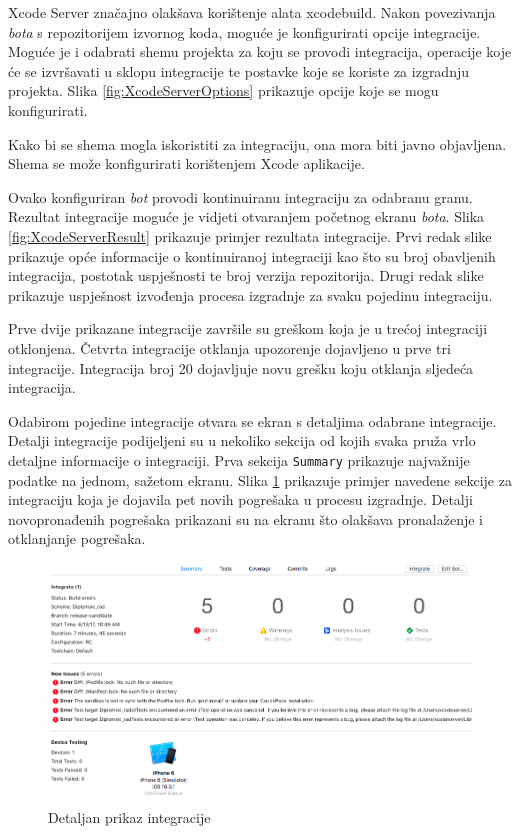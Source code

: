 \documentclass[times, utf8, diplomski, numeric]{fer}
\begin{document}
Xcode Server značajno olakšava korištenje alata xcodebuild. Nakon povezivanja \textit{bota} s repozitorijem izvornog koda, moguće je konfigurirati opcije integracije. Moguće je i odabrati shemu projekta za koju se provodi integracija, operacije koje će se izvršavati u sklopu integracije te postavke koje se koriste za izgradnju projekta. Slika \ref{fig:XcodeServerOptions} prikazuje opcije koje se mogu konfigurirati.

Kako bi se shema mogla iskoristiti za integraciju, ona mora biti javno objavljena. Shema se može konfigurirati korištenjem Xcode aplikacije.

Ovako konfiguriran \textit{bot} provodi kontinuiranu integraciju za odabranu granu. Rezultat integracije moguće je vidjeti otvaranjem početnog ekranu \textit{bota}. Slika \ref{fig:XcodeServerResult} prikazuje primjer rezultata integracije. Prvi redak slike prikazuje opće informacije o kontinuiranoj integraciji kao što su broj obavljenih integracija, postotak uspješnosti te broj verzija repozitorija. Drugi redak slike prikazuje uspješnost izvođenja procesa izgradnje za svaku pojedinu integraciju.

Prve dvije prikazane integracije završile su greškom koja je u trećoj integraciji otklonjena. Četvrta integracije otklanja upozorenje dojavljeno u prve tri integracije. Integracija broj 20 dojavljuje novu grešku koju otklanja sljedeća integracija.

Odabirom pojedine integracije otvara se ekran s detaljima odabrane integracije. Detalji integracije podijeljeni su u nekoliko sekcija od kojih svaka pruža vrlo detaljne informacije o integraciji. Prva sekcija \verb|Summary| prikazuje najvažnije podatke na jednom, sažetom ekranu. Slika \ref{fig:XcodeServerSingleIntegration} prikazuje primjer navedene sekcije za integraciju koja je dojavila pet novih pogrešaka u procesu izgradnje. Detalji novopronađenih pogrešaka prikazani su na ekranu što olakšava pronalaženje i otklanjanje pogrešaka.

\begin{figure}
\centering
\includegraphics[scale=0.4]{XcodeServerSingleIntegration}
\caption{Detaljan prikaz integracije}
\label{fig:XcodeServerSingleIntegration}
\end{figure}
\end{document}
